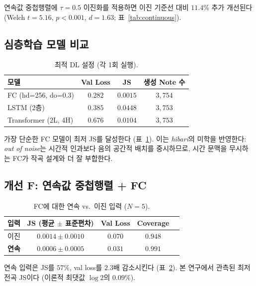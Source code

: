 \documentclass[11pt,a4paper]{article}
\begin{document}
연속값 중첩행렬에 $\tau = 0.5$ 이진화를 적용하면 이진 기준선 대비
$11.4\%$ 추가 개선된다 (Welch $t = 5.16$, $p < 0.001$, $d = 1.63$;
표~\ref{tab:continuous}).

\subsection{심층학습 모델 비교}
\label{subsec:dl}

\begin{table}[H]
\centering
\caption{최적 DL 설정 (각 1회 실행).}
\label{tab:dl}
\begin{tabular}{lccc}
\toprule
모델 & Val Loss & JS & 생성 Note 수 \\
\midrule
FC (hd=256, do=0.3)   & $0.282$ & $\mathbf{0.0015}$ & $3{,}754$ \\
LSTM (2층)              & $0.385$ & $0.0448$ & $3{,}753$ \\
Transformer (2L, 4H)   & $0.676$ & $0.0104$ & $3{,}753$ \\
\bottomrule
\end{tabular}
\end{table}

가장 단순한 FC 모델이 최저 JS를 달성한다 (표~\ref{tab:dl}).
이는 \emph{hibari}의 미학을 반영한다: \emph{out of noise}는
시간적 인과보다 음의 공간적 배치를 중시하므로, 시간 문맥을
무시하는 FC가 작곡 설계와 더 잘 부합한다.

\subsection{개선 F: 연속값 중첩행렬 + FC}
\label{subsec:improvF}

\begin{table}[H]
\centering
\caption{FC에 대한 연속 vs.\ 이진 입력 ($N=5$).}
\label{tab:improvF}
\begin{tabular}{lcccc}
\toprule
입력 & JS (평균 $\pm$ 표준편차) & Val Loss & Coverage \\
\midrule
이진      & $0.0014 \pm 0.0010$ & $0.070$ & $0.948$ \\
\textbf{연속} & $\mathbf{0.0006 \pm 0.0005}$ & $\mathbf{0.031}$ & $\mathbf{0.991}$ \\
\bottomrule
\end{tabular}
\end{table}

연속 입력은 JS를 $57\%$, val loss를 $2.3$배 감소시킨다
(표~\ref{tab:improvF}). 본 연구에서 관측된 최저 전곡 JS이다
(이론적 최댓값 $\log 2$의 $0.09\%$).
\end{document}
